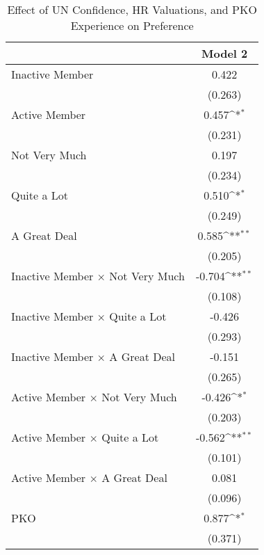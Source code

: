 \begin{table}[htbp]\centering
\fontsize{6}{6}\selectfont
\def\sym#1{\ifmmode^{#1}\else\(^{#1}\)\fi}
\caption{Effect of UN Confidence, HR Valuations, and PKO Experience on Preference}
\vspace{-4mm}
\begin{tabular}{l*{1}{c}}
\hline\hline
                    &\multicolumn{1}{c}{Model 2}        \\
\hline
Inactive Member     &       0.422        \\
                    &     (0.263)        \\
[0.25em]
Active Member       &       0.457\sym{*} \\
                    &     (0.231)        \\
[0.25em]
Not Very Much       &       0.197        \\
                    &     (0.234)        \\
[0.25em]
Quite a Lot         &       0.510\sym{*} \\
                    &     (0.249)        \\
[0.25em]
A Great Deal        &       0.585\sym{**}\\
                    &     (0.205)        \\
[0.25em]
Inactive Member $\times$ Not Very Much&      -0.704\sym{**}\\
                    &     (0.108)        \\
[0.25em]
Inactive Member $\times$ Quite a Lot&      -0.426        \\
                    &     (0.293)        \\
[0.25em]
Inactive Member $\times$ A Great Deal&      -0.151        \\
                    &     (0.265)        \\
[0.25em]
Active Member $\times$ Not Very Much&      -0.426\sym{*} \\
                    &     (0.203)        \\
[0.25em]
Active Member $\times$ Quite a Lot&      -0.562\sym{**}\\
                    &     (0.101)        \\
[0.25em]
Active Member $\times$ A Great Deal&       0.081        \\
                    &     (0.096)        \\
[0.25em]
PKO &       0.877\sym{*} \\
                    &     (0.371)        \\

\end{tabular}
\end{table}
